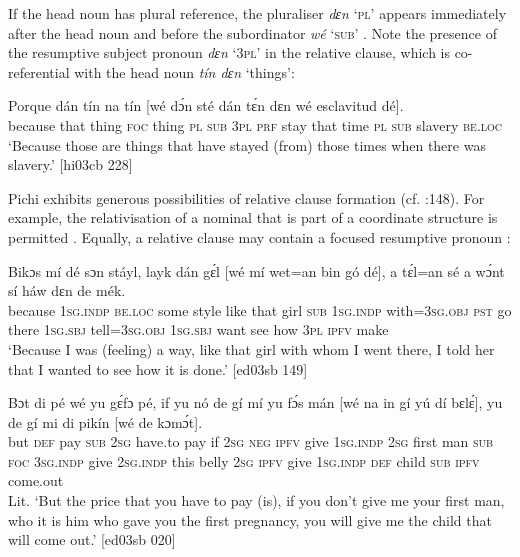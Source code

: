 If the head noun has plural reference, the pluraliser \textit{dɛn} ‘\textsc{pl}’ appears immediately after the head noun and before the subordinator \textit{wé} ‘\textsc{sub}’ . Note the presence of the resumptive subject pronoun \textit{dɛn} ‘\textsc{3pl}’ in the relative clause, which is co-referential with the head noun \textit{tín dɛn} ‘things’: 


\ea%
    \label{ex:key:1425}
    \gll Porque  dán    tín    na  tín        [wé    dɔ́n  sté  
dán  tɛ́n    dɛn  wé  esclavitud  dé].\\
because  that    thing  \textsc{foc}  thing  \textsc{pl}     \textsc{sub}  \textsc{3pl}  \textsc{prf}  stay  
that  time    \textsc{pl}  \textsc{sub}  slavery    \textsc{be.loc}\\
\glt ‘Because those are things that have stayed (from) those times when there
was slavery.’ [hi03cb 228]
\z

Pichi exhibits generous possibilities of relative clause formation (cf. \citealt{Keenan1985}:148). For example, the relativisation of a nominal that is part of a coordinate structure is permitted . Equally, a relative clause may contain a focused resumptive pronoun :


\ea%
    \label{ex:key:1426}
    \gll Bikɔs  mí    dé    sɔn    stáyl,  layk  dán  gɛ́l  [wé  mí    wet=an
bin  gó  dé],    a    tɛ́l=an  sé  a    wɔ́nt  sí  háw  dɛn  de  mék.\\
because  \textsc{1sg.indp}  \textsc{be.loc}  some  style  like  that  girl   \textsc{sub}  \textsc{1sg.indp}  with\textsc{=3sg.obj}
\textsc{pst}  go  there  \textsc{1sg.sbj}  tell=\textsc{3sg.obj}  {} \textsc{1sg.sbj}  want  see  how  \textsc{3pl}  \textsc{ipfv}  make\\
\glt ‘Because I was (feeling) a way, like that girl with whom I went there, I told her that
I wanted to see how it is done.’ [ed03sb 149]
\z


\ea%
    \label{ex:key:1427}
    \gll Bɔt  di  pé  wé  yu  gɛ́fɔ    pé,  if  yu  nó  de    gí  mí    yu
fɔ́s    mán  [wé  na  in    gí    yú    dí  bɛlɛ́],  yu  de  gí
mi    di  pikín  [wé  de  kɔmɔ́t].\\
but  \textsc{def}  pay  \textsc{sub}  \textsc{2sg}  have.to  pay  if  \textsc{2sg}  \textsc{neg}  \textsc{ipfv}    give  \textsc{1sg.indp}  \textsc{2sg}
first    man     \textsc{sub}  \textsc{foc}  \textsc{3sg.indp}  give    \textsc{2sg.indp}  this  belly  \textsc{2sg}  \textsc{ipfv}  give
\textsc{1sg.indp}  \textsc{def}  child   \textsc{sub}  \textsc{ipfv}  come.out\\
\glt 
Lit. ‘But the price that you have to pay (is), if you don’t give me your first man,
who it is him who gave you the first pregnancy, you will give me the child that
will come out.’ [ed03sb 020]
\z

